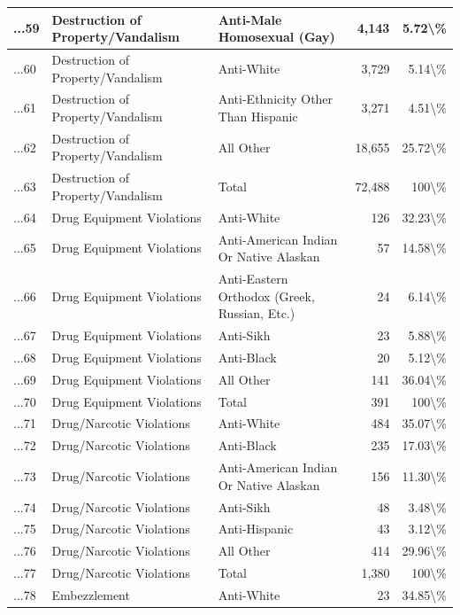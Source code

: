\documentclass[
]{krantz}
\begin{document}
\begin{longtable}[t]{l|l|l|r|r}
\hline
...59 & Destruction of Property/Vandalism & Anti-Male Homosexual (Gay) & 4,143 & 5.72\textbackslash{}\%\\
\hline
...60 & Destruction of Property/Vandalism & Anti-White & 3,729 & 5.14\textbackslash{}\%\\
\hline
...61 & Destruction of Property/Vandalism & Anti-Ethnicity Other Than Hispanic & 3,271 & 4.51\textbackslash{}\%\\
\hline
...62 & Destruction of Property/Vandalism & All Other & 18,655 & 25.72\textbackslash{}\%\\
\hline
...63 & Destruction of Property/Vandalism & Total & 72,488 & 100\textbackslash{}\%\\
\hline
...64 & Drug Equipment Violations & Anti-White & 126 & 32.23\textbackslash{}\%\\
\hline
...65 & Drug Equipment Violations & Anti-American Indian Or Native Alaskan & 57 & 14.58\textbackslash{}\%\\
\hline
...66 & Drug Equipment Violations & Anti-Eastern Orthodox (Greek, Russian, Etc.) & 24 & 6.14\textbackslash{}\%\\
\hline
...67 & Drug Equipment Violations & Anti-Sikh & 23 & 5.88\textbackslash{}\%\\
\hline
...68 & Drug Equipment Violations & Anti-Black & 20 & 5.12\textbackslash{}\%\\
\hline
...69 & Drug Equipment Violations & All Other & 141 & 36.04\textbackslash{}\%\\
\hline
...70 & Drug Equipment Violations & Total & 391 & 100\textbackslash{}\%\\
\hline
...71 & Drug/Narcotic Violations & Anti-White & 484 & 35.07\textbackslash{}\%\\
\hline
...72 & Drug/Narcotic Violations & Anti-Black & 235 & 17.03\textbackslash{}\%\\
\hline
...73 & Drug/Narcotic Violations & Anti-American Indian Or Native Alaskan & 156 & 11.30\textbackslash{}\%\\
\hline
...74 & Drug/Narcotic Violations & Anti-Sikh & 48 & 3.48\textbackslash{}\%\\
\hline
...75 & Drug/Narcotic Violations & Anti-Hispanic & 43 & 3.12\textbackslash{}\%\\
\hline
...76 & Drug/Narcotic Violations & All Other & 414 & 29.96\textbackslash{}\%\\
\hline
...77 & Drug/Narcotic Violations & Total & 1,380 & 100\textbackslash{}\%\\
\hline
...78 & Embezzlement & Anti-White & 23 & 34.85\textbackslash{}\%\\

\end{longtable}
\end{document}
